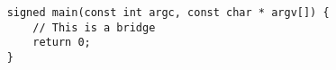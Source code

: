 \documentclass[]{article}
\begin{document}

\begin{lstlisting}
    signed main(const int argc, const char * argv[]) {
        // This is a bridge
        return 0;
    }
\end{lstlisting}
\end{document}
